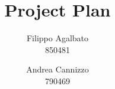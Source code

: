 \documentclass[a4paper]{report}
\begin{document}
\setcounter{tocdepth}{1}

\title{\Huge Project Plan}
\author{Filippo Agalbato \\ 850481 \and Andrea Cannizzo \\ 790469}
\maketitle

\tableofcontents






\appendix

\end{document}
